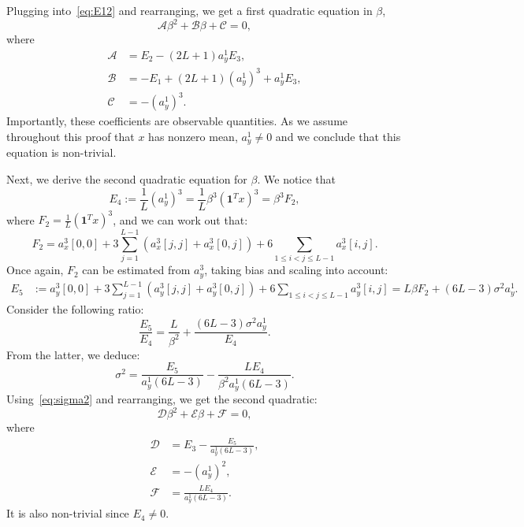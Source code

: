 \documentclass[12pt]{article}
\newcommand{\1}{\mathbf{1}}
\newcommand{\one}{\mathbf{1}}
\theoremstyle{plain}
\theoremstyle{definition}
\theoremstyle{remark}
\theoremstyle{plain}
\theoremstyle{remark}
\theoremstyle{plain}
\theoremstyle{plain}
\theoremstyle{plain}
\numberwithin{equation}{section}
\begin{document}
Plugging into~\eqref{eq:E12} and rearranging, we get a first quadratic equation in $\beta$,
\begin{equation} \label{eq:quad1}
\mathcal{A}\beta^2 + \mathcal{B}\beta + \mathcal{C} = 0,
\end{equation}
where 
\begin{align*}
\mathcal{A} &= E_2 - (2L+1)a_y^1E_3, \\ 
\mathcal{B} &= -E_1 + (2L+1)(a_y^1)^3 + a_y^1E_3  , \\
\mathcal{C} &= -(a_y^1)^3.
\end{align*}
Importantly, these coefficients are observable quantities. As we assume throughout this proof that $x$ has nonzero mean, $a_y^1 \neq 0$ and we conclude that this equation is non-trivial.

Next, we derive the second quadratic equation for $\beta$. We notice that 
\begin{equation} \label{eq:E3}
E_4 := \frac{1}{L}(a_y^1)^3 = \frac{1}{L}\beta^3 (\one ^Tx)^3   = \beta^3 F_2,
\end{equation}
where $F_2 = \frac{1}{L}(\one ^Tx)^3$, and we can work out that:
\begin{equation*}
F_2 = a_x^3[0,0] + 3\sum_{j=1}^{L-1} \left(a_x^3[j,j] + a_x^3[0,j]\right) + 6\sum_{1\leq i < j\leq L-1}a_x^3[i,j].
\end{equation*}
Once again, $F_2$ can be estimated from $a_y^3$, taking bias and scaling into account:
\begin{align}
E_5 & := a_y^3[0,0] + 3\sum_{j=1}^{L-1} \left(a_y^3[j,j] + a_y^3[0,j]\right) + 6\sum_{1\leq i < j\leq L-1}a_y^3[i,j]  = L \beta F_2 + (6L-3)\sigma^2a_y^1.
\end{align}
Consider the following ratio:
\begin{equation*} 
\frac{E_5}{E_4} = \frac{L}{\beta^2} + \frac{(6L-3)\sigma^2a_y^1}{E_4}.
\end{equation*}
From the latter, we deduce:
\begin{equation*}
\sigma^2 = \frac{E_5}{a_y^1(6L-3)}  - \frac{LE_4}{\beta^2a_y^1(6L-3)}.
\end{equation*}
Using~\eqref{eq:sigma2} and rearranging, we get the second quadratic:
\begin{equation} \label{eq:quad2}
\mathcal{D}\beta^2 + \mathcal{E}\beta + \mathcal{F} = 0,
\end{equation}
where
\begin{align*}
\mathcal{D} &= E_3 - \frac{E_5}{a_y^1(6L-3)}, \\ 
\mathcal{E} &= -(a_y^1)^2, \\
\mathcal{F} &= \frac{LE_4}{a_y^1(6L-3)}.
\end{align*}
It is also non-trivial since $E_4 \neq 0$.
\end{document}
